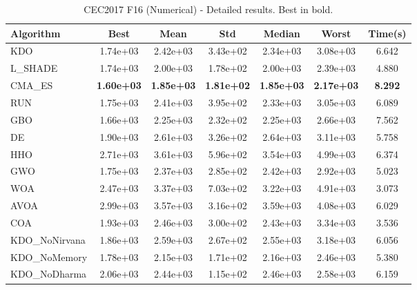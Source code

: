 \begin{table}[H]
\centering\small
\caption{CEC2017 F16 (Numerical) - Detailed results. Best in bold.}
\label{tab:cec2017_F16}
\begin{tabular}{lcccccc}
\toprule
\textbf{Algorithm} & \textbf{Best} & \textbf{Mean} & \textbf{Std} & \textbf{Median} & \textbf{Worst} & \textbf{Time(s)} \\
\midrule
KDO & 1.74e+03 & 2.42e+03 & 3.43e+02 & 2.34e+03 & 3.08e+03 & 6.642 \\
L_SHADE & 1.74e+03 & 2.00e+03 & 1.78e+02 & 2.00e+03 & 2.39e+03 & 4.880 \\
CMA_ES & \textbf{1.60e+03} & \textbf{1.85e+03} & \textbf{1.81e+02} & \textbf{1.85e+03} & \textbf{2.17e+03} & \textbf{8.292} \\
RUN & 1.75e+03 & 2.41e+03 & 3.95e+02 & 2.33e+03 & 3.05e+03 & 6.089 \\
GBO & 1.66e+03 & 2.25e+03 & 2.32e+02 & 2.25e+03 & 2.66e+03 & 7.562 \\
DE & 1.90e+03 & 2.61e+03 & 3.26e+02 & 2.64e+03 & 3.11e+03 & 5.758 \\
HHO & 2.71e+03 & 3.61e+03 & 5.96e+02 & 3.54e+03 & 4.99e+03 & 6.374 \\
GWO & 1.75e+03 & 2.37e+03 & 2.85e+02 & 2.42e+03 & 2.92e+03 & 5.023 \\
WOA & 2.47e+03 & 3.37e+03 & 7.03e+02 & 3.22e+03 & 4.91e+03 & 3.073 \\
AVOA & 2.99e+03 & 3.57e+03 & 3.16e+02 & 3.59e+03 & 4.08e+03 & 6.029 \\
COA & 1.93e+03 & 2.46e+03 & 3.00e+02 & 2.43e+03 & 3.34e+03 & 3.536 \\
KDO_NoNirvana & 1.86e+03 & 2.59e+03 & 2.67e+02 & 2.55e+03 & 3.18e+03 & 6.056 \\
KDO_NoMemory & 1.78e+03 & 2.15e+03 & 1.71e+02 & 2.16e+03 & 2.46e+03 & 5.380 \\
KDO_NoDharma & 2.06e+03 & 2.44e+03 & 1.15e+02 & 2.46e+03 & 2.58e+03 & 6.159 \\
\bottomrule
\end{tabular}
\end{table}
